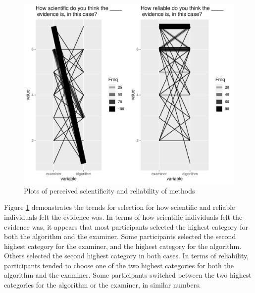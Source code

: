 \documentclass[print]{nuthesis}
\begin{document}
\begin{figure}

{\centering \includegraphics[width=\linewidth]{thesis_files/figure-latex/coordscirel-1} 

}

\caption{Plots of perceived scientificity and reliability of methods}\label{fig:coordscirel}
\end{figure}

Figure \ref{fig:coordscirel} demonstrates the trends for selection for how scientific and reliable individuals felt the evidence was.
In terms of how scientific individuals felt the evidence was, it appears that most participants selected the highest category for both the algorithm and the examiner.
Some participants selected the second highest category for the examiner, and the highest category for the algorithm.
Others selected the second highest category in both cases.
In terms of reliability, participants tended to choose one of the two highest categories for both the algorithm and the examiner.
Some participants switched between the two highest categories for the algorithm or the examiner, in similar numbers.
\end{document}
